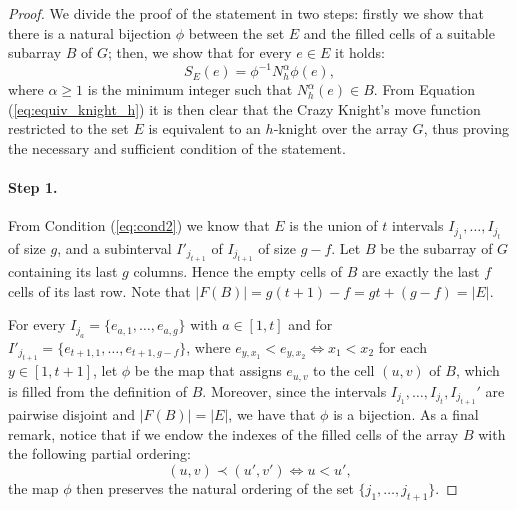 \documentclass{amsart}
\theoremstyle{definition}
\numberwithin{equation}{section}
\begin{document}
\begin{proof}
We divide the proof of the statement in two steps:  firstly we show  that there is a natural bijection $\phi$ between the set $E$ and the filled cells of a suitable subarray $B$ of $G$; then, we show that for every $e \in E$ it holds:
\begin{equation}\label{eq:equiv_knight_h}
S_E(e) = \phi^{-1}N_h^\alpha\phi(e),
\end{equation}
where $\alpha\geq 1$ is the minimum integer such that $N_h^\alpha(e) \in B$. From Equation (\ref{eq:equiv_knight_h}) it is then clear that the Crazy Knight's move function restricted to the set $E$ is equivalent to an $h$-knight over the array $G$, thus proving the necessary and sufficient condition of the statement.

\paragraph{\textbf{Step 1.}} From Condition (\ref{eq:cond2}) we know that $E$ is the union of $t$ intervals $I_{j_1}, \dotsc, I_{j_t}$ of size $g$, and  a  subinterval $I'_{j_{t+1}} $ of $I_{j_{t+1}}$ of size $g-f$. Let $B $ be the subarray of $G$ containing its last $g$ columns. Hence the empty cells of $B$ are exactly the last $f$ cells of its last row. Note that $|F(B)|=g(t+1)-f=gt+(g-f)=|E|.$

For every $I_{j_a} = \{e_{a,1}, \dotsc, e_{a,g}\}$ with $a \in [1,t]$ and for $I'_{j_{t+1}} = \{e_{t+1,1},\dotsc, e_{t+1,g-f} \}$, where $e_{y,x_1}<e_{y,x_2} \Leftrightarrow x_1<x_2$ for each $y \in [1,t+1]$, let $\phi$ be the map that assigns $e_{u,v}$ to the cell $(u,v)$ of $B$, which is filled from the definition of $B$. Moreover, since the intervals $I_{j_1},\dotsc,I_{j_{t}},I_{j_{t+1}}'$ are pairwise disjoint and $|F(B)| = |E|$, we have that $\phi$ is a bijection. As a final remark, notice that if we endow the indexes of the filled cells of the array $B$ with the following partial ordering:
\[
(u,v) \prec (u',v') \Leftrightarrow u<u',
\]
 the map $\phi$ then preserves the natural ordering of the set $\{j_1, \dotsc, j_{t+1}\}$.


\end{proof}
\end{document}
